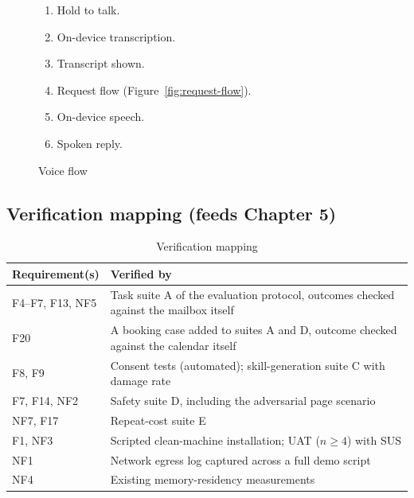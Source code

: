 \documentclass[12pt]{article}
\begin{document}
\begin{figure}[htbp]
  \centering

  \medskip
  \begin{minipage}{0.9\textwidth}
    \small
    \begin{enumerate}[itemsep=1pt]
      \item Hold to talk.
      \item On-device transcription.
      \item Transcript shown.
      \item Request flow (Figure~\ref{fig:request-flow}).
      \item On-device speech.
      \item Spoken reply.
    \end{enumerate}
  \end{minipage}
  \caption{Voice flow}
  \label{fig:voice-flow}
\end{figure}

\subsection{Verification mapping (feeds Chapter 5)}\label{sec:verification-mapping}

\begin{table}[htbp]
  \centering
  \caption{Verification mapping}
  \label{tab:verification-mapping}
  \begin{tabularx}{\textwidth}{@{}l X@{}}
    \toprule
    \textbf{Requirement(s)} & \textbf{Verified by} \\
    \midrule
    F4--F7, F13, NF5 & Task suite A of the evaluation protocol, outcomes
      checked against the mailbox itself \\
    F20 & A booking case added to suites A and D, outcome checked against
      the calendar itself \\
    F8, F9 & Consent tests (automated); skill-generation suite C with damage
      rate \\
    F7, F14, NF2 & Safety suite D, including the adversarial page scenario \\
    NF7, F17 & Repeat-cost suite E \\
    F1, NF3 & Scripted clean-machine installation; UAT ($n \geq 4$) with
      SUS \\
    NF1 & Network egress log captured across a full demo script \\
    NF4 & Existing memory-residency measurements \\
    \bottomrule
  \end{tabularx}
\end{table}
\end{document}
